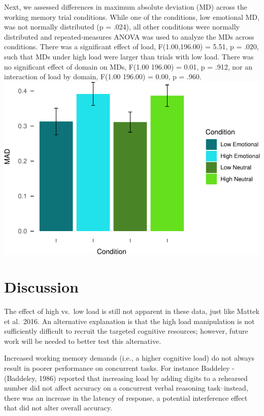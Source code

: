 \documentclass[man]{apa6}
\begin{document}
Next, we assessed differences in maximum absolute deviation (MD) across the working memory trial conditions. While one of the conditions, low emotional MD, was not normally distributed (p = .024), all other conditions were normally distributed and repeated-measures ANOVA was used to analyze the MDs across conditions. There was a significant effect of load, F(1.00,196.00) = 5.51, p = .020, such that MDs under high load were larger than trials with low load. There was no significant effect of domain on MDs, F(1.00 196.00) = 0.01, p = .912, nor an interaction of load by domain, F(1.00 196.00) = 0.00, p = .960.
\includegraphics{Manuscript_files/figure-latex/MAD plot-1.pdf}

\hypertarget{discussion}{%
\section{Discussion}\label{discussion}}

The effect of high vs.~low load is still not apparent in these data, just like Mattek et al.~2016. An alternative explanation is that the high load manipulation is not sufficiently difficult to recruit the targeted cognitive resources; however, future work will be needed to better test this alternative.

Increased working memory demands (i.e., a higher cognitive load) do not always result in poorer performance on concurrent tasks. For instance Baddeley -(Baddeley, 1986) reported that increasing load by adding digits to a rehearsed number did not affect accuracy on a concurrent verbal reasoning task--instead, there was an increase in the latency of response, a potential interference effect that did not alter overall accuracy.
\end{document}

